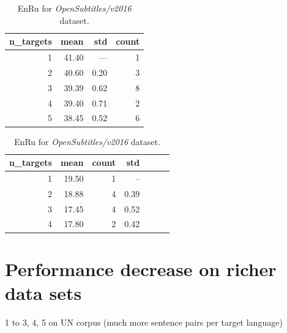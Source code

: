 \begin{table}[h!]
\begin{subtable}[t]{0.45\linewidth}
	\centering
	\begin{tabular}{rrrr}
	\toprule
	n\_targets &   mean &   std & count \\
	\midrule
	         1 &  41.40 &  ---  &   1 \\
	         2 &  40.60 &  0.20 &   3 \\
	         3 &  39.39 &  0.62 &   8 \\
	         4 &  39.40 &  0.71 &   2 \\
	         5 &  38.45 &  0.52 &   6 \\
	\bottomrule
	\end{tabular}

	\caption{
		En\to{}Bg for \emph{Europarl/v7} dataset.
		}
	\label{tab:bg/Europarl/v7}
\end{subtable}
\begin{subtable}[t]{0.45\linewidth}
	\centering
	\begin{tabular}{rrrrrrr}
	\toprule
	n\_targets & mean & count & std \\
	\midrule
	        1 &     19.50 &    1 &   --  \\
	        2 &     18.88 &    4 &  0.39 \\
	        3 &     17.45 &    4 &  0.52 \\
	        4 &     17.80 &    2 &  0.42 \\
	\bottomrule
	\end{tabular}
	
	\caption{
		En\to{}Ru for \emph{OpenSubtitles/v2016} dataset.
		}
	\label{ table:ru/OpenSubtitles/v2016 }
\end{subtable}
\end{table}



% 

\section{Performance decrease on richer data sets}
1 to 3, 4, 5 on UN corpus (much more sentence pairs per target language)
\cite{eisele-chen-2010-multiun}

